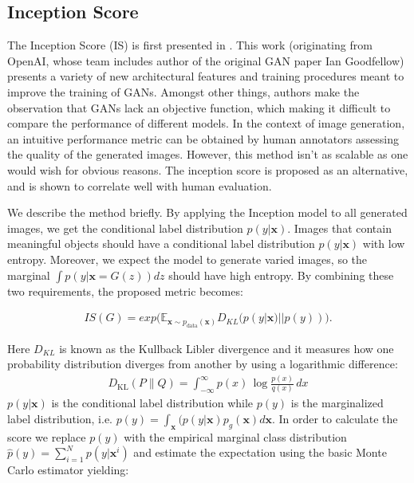 \subsection{Inception Score}
The Inception Score (IS) is first presented in \cite{salimans2016improved}. This work (originating from OpenAI, whose team includes author of the original GAN paper Ian Goodfellow) presents a variety of new architectural features and training procedures meant to improve the training of GANs. Amongst other things, authors make the observation that GANs lack an objective function, which making it difficult to compare the performance of different models. In the context of image generation, an intuitive performance metric can be obtained by human annotators assessing the quality of the generated images. However, this method isn't as scalable as one would wish for obvious reasons. The inception score is proposed as an alternative, and is shown to correlate well with human evaluation. 

We describe the method briefly. By applying the Inception model \cite{inceptionv2} to all generated images, we get the conditional label distribution $p(y|\bm{x})$. Images that contain meaningful objects should have a conditional label distribution $p(y|\bm{x})$ with low entropy. Moreover, we expect the model to generate varied images, so the marginal $\int p(y|\bm{x} = G(z))dz$ should have high entropy. By combining these two requirements, the proposed metric becomes: 

\begin{equation}
\label{eq_IS}
\begin{split}
IS(G) = exp\big(\mathbb{E}_{\bm{x} \sim p_{\text{data}}(\bm{x})}D_{KL}(p(y|\bm{x})||p(y))\big).
\end{split}
\end{equation}

Here $D_{KL}$ is known as the Kullback Libler divergence and it measures how one probability distribution diverges from another by using a logarithmic difference:
\begin{eqnarray}
	D_{\mathrm {KL} }(P\|Q)=\int _{-\infty }^{\infty }p(x)\,\log {\frac {p(x)}{q(x)}}\,dx
\end{eqnarray}
 $p(y|\bm{x})$ is the conditional label distribution while $p(y)$ is the  marginalized label distribution, i.e. $p(y)=\int_{\bm{x}} (p(y|\bm{x})p_g(\bm{x}) d\bm{x}$. In order to calculate the score we replace $p(y)$ with the empirical marginal class distribution $\hat{p}(y) = \sum^N_{i=1} p(y|\bm{x}^i)$ and estimate the expectation using the basic Monte Carlo estimator yielding:

